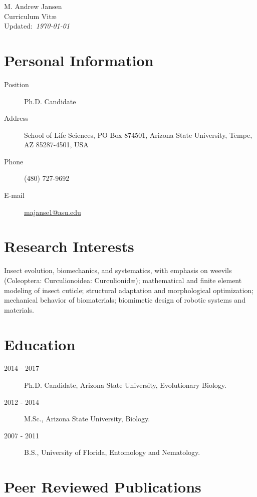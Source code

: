 \documentclass[12pt,a4paper]{article}
\begin{document}
\begin{center}
	{\LARGE M. Andrew Jansen}\\
	\medskip
	{\Large Curriculum Vit\ae}\\
	Updated:~\textit{\today}
\end{center}

\section*{Personal Information}

	\begin{description}
		\item [Position] \tabto*{2cm} Ph.D. Candidate
		\item [Address] \tabto*{2cm} School of Life Sciences, PO Box 874501, Arizona State University, Tempe, AZ 85287-4501, USA
		\item [Phone] \tabto*{2cm} (480) 727-9692
		\item [E-mail] \tabto*{2cm} \href{mailto:majanse1@asu.edu}{majanse1@asu.edu}
	\end{description}

\section*{Research Interests}

	Insect evolution, biomechanics, and systematics, with emphasis on weevils (Coleoptera: Curculionoidea: Curculionid\ae);
	mathematical and finite element modeling of insect cuticle;
	structural adaptation and morphological optimization;
	mechanical behavior of biomaterials;
	biomimetic design of robotic systems and materials.

\section*{Education}

	\begin{description}
		\item [2014 - 2017] Ph.D. Candidate, Arizona State University, Evolutionary Biology.
		\item [2012 - 2014] M.Sc., Arizona State University, Biology.
		\item [2007 - 2011] B.S., University of Florida, Entomology and Nematology.
	\end{description}

\section*{Peer Reviewed Publications}
\end{document}
